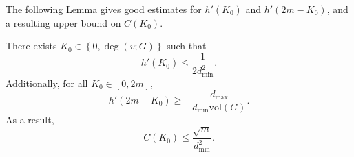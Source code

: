 \documentclass[11pt,twoside]{article}
\newcommand{\set}[1]{\left\{#1\right\}}
\newcommand{\vol}{\mathrm{vol}}
\newcommand{\1}{\mathbbm{1}}
\begin{document}
The following Lemma gives good estimates for $h'(K_0)$ and $h'(2m - K_0)$, and a resulting upper bound on $C(K_0)$.
\begin{lemma}
	\label{lem:linearization_bound}
	There exists $K_0 \in \set{0,\deg(v;G)}$ such that
	\begin{equation}
	\label{eqn:left_derivative}
	h'(K_0) \leq  \frac{1}{2d_{\min}^2}.
	\end{equation}
	Additionally, for all $K_0 \in [0,2m]$,
	\begin{equation}
	\label{eqn:right_derivative}
	h'(2m - K_0) \geq -\frac{d_{\max}}{d_{\min}\vol(G)}.
	\end{equation}
	As a result,
	\begin{equation*}
	C(K_0) \leq \frac{\sqrt{m}}{d_{\min}^2}.
	\end{equation*}
\end{lemma}
\end{document}
